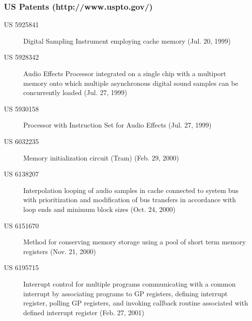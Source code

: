 \documentclass[a4paper,8pt,english]{sphinxmanual}
\begin{document}
\subsubsection{US Patents (http://www.uspto.gov/)}
\label{sound/cards/audigy-mixer:us-patents-http-www-uspto-gov}\begin{description}
\item[{US 5925841}] \leavevmode
Digital Sampling Instrument employing cache memory (Jul. 20, 1999)

\item[{US 5928342}] \leavevmode
Audio Effects Processor integrated on a single chip
with a multiport memory onto which multiple asynchronous
digital sound samples can be concurrently loaded
(Jul. 27, 1999)

\item[{US 5930158}] \leavevmode
Processor with Instruction Set for Audio Effects (Jul. 27, 1999)

\item[{US 6032235}] \leavevmode
Memory initialization circuit (Tram) (Feb. 29, 2000)

\item[{US 6138207}] \leavevmode
Interpolation looping of audio samples in cache connected to
system bus with prioritization and modification of bus transfers
in accordance with loop ends and minimum block sizes
(Oct. 24, 2000)

\item[{US 6151670}] \leavevmode
Method for conserving memory storage using a
pool of  short term memory registers
(Nov. 21, 2000)

\item[{US 6195715}] \leavevmode
Interrupt control for multiple programs communicating with
a common interrupt by associating programs to GP registers,
defining interrupt register, polling GP registers, and invoking
callback routine associated with defined interrupt register
(Feb. 27, 2001)

\end{description}
\end{document}
